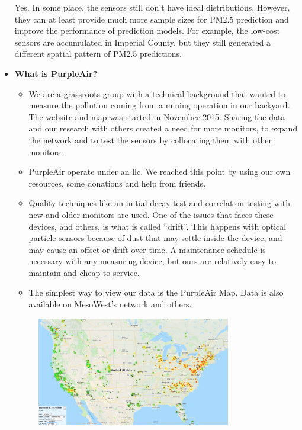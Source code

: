 \documentclass{article}
\begin{document}
\begin{itemize}
{    Yes. In some place, the sensors still don't have ideal distributions. However, they can at least provide much more sample sizes for PM2.5 prediction and improve the performance of prediction models. For example, the low-cost sensors are accumulated in Imperial County, but they still generated a different spatial pattern of PM2.5 predictions. 
    }
    \item \textbf{What is PurpleAir?}
        \begin{itemize}
            \item We are a grassroots group with a technical background that wanted to measure the pollution coming from a mining operation in our backyard. The website and map was started in November 2015. Sharing the data and our research with others created a need for more monitors, to expand the network and to test the sensors by collocating them with other monitors.
            \item PurpleAir operate under an llc. We reached this point by using our own resources, some donations and help from friends.
            \item Quality techniques like an initial decay test and correlation testing with new and older monitors are used. One of the issues that faces these devices, and others, is what is called “drift”. This happens with optical particle sensors because of dust that may settle inside the device, and may cause an offset or drift over time. A maintenance schedule is necessary with any measuring device, but ours are relatively easy to maintain and cheap to service.
            \item The simplest way to view our data is the PurpleAir Map. Data is also available on MesoWest's network and others.
        \end{itemize}
        \begin{figure}[H]
            \centering
            \includegraphics[width=0.8\textwidth]{img/purpleair.jpg}
            \label{fig:pa}

\end{figure}
\end{itemize}
\end{document}
